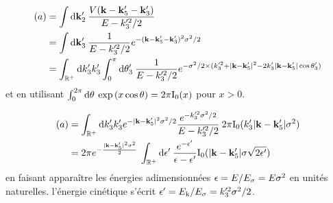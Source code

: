 \begin{align}
(a)&= \int{\mathop{}\mathopen{}\mathrm{d}\mathbf{k}_{\mathrm{2}}' \: \frac{V(\mathbf{k}-\mathbf{k}_{\mathrm{5}}'-\mathbf{k}_{\mathrm{3}}')}{E-k_{\mathrm{3}}'^2/2}} \\
&= \int{\mathop{}\mathopen{}\mathrm{d}\mathbf{k}_{\mathrm{3}}' \: \frac{1}{E-k_{\mathrm{3}}'^2/2} e^{-(\mathbf{k}-\mathbf{k}_{\mathrm{5}}'-\mathbf{k}_{\mathrm{3}}')^2 \sigma^2/2}} \\
&= \int_{\mathbb{R}^+}{\mathop{}\mathopen{}\mathrm{d} k_{\mathrm{3}}' k_{\mathrm{3}}' \int_0^{\pi}{\mathop{}\mathopen{}\mathrm{d}\theta_{\mathrm{3}}'\: \frac{1}{E-k_{\mathrm{3}}'^2/2}e^{-\sigma^2/2\times (k_{\mathrm{3}}'^2+|\mathbf{k}-\mathbf{k}_{\mathrm{5}}'|^2-2k_{\mathrm{3}}' |\mathbf{k}-\mathbf{k}_{\mathrm{5}}'| \cos{\theta_{\mathrm{3}}'})}}}
\end{align}
et en utilisant $\int_0^{2\pi}{\mathop{}\mathopen{}\mathrm{d}\theta\:\exp{(x\cos{\theta})}} =2\pi \mathrm{I_0}(x)$ pour $x>0$.

\begin{align}
(a)&=\int_{\mathbb{R}^+}{\mathop{}\mathopen{}\mathrm{d} k_{\mathrm{3}}' k_{\mathrm{3}}' e^{-|\mathbf{k}-\mathbf{k}_{\mathrm{5}}'|^2 \sigma^2/2} \frac{e^{-k_{\mathrm{3}}'^2\sigma^2/2}}{E-k_{\mathrm{3}}'^2/2} \: 2\pi \mathrm{I_0}(k_{\mathrm{3}}' |\mathbf{k}-\mathbf{k}_{\mathrm{5}}'|\sigma^2)} \\
&= 2\pi e^{-\frac{|\mathbf{k}-\mathbf{k}_{\mathrm{5}}'|^2\sigma^2}{2}} \: \int_{\mathbb{R}^+}{\mathop{}\mathopen{}\mathrm{d}\epsilon'\:\frac{e^{-\epsilon'}}{\epsilon-\epsilon'}\mathrm{I_0}(|\mathbf{k}-\mathbf{k}_{\mathrm{5}}'|\sigma\sqrt{2\epsilon'})}
\end{align}
en faisant apparaître les énergies adimensionnées $\epsilon=E/E_{\sigma}=E\sigma^2$ en unités naturelles. l'énergie cinétique s'écrit $\epsilon'=E_{\mathrm{k}}/E_{\sigma}=k_{\mathrm{3}}'^2\sigma^2/2$.

